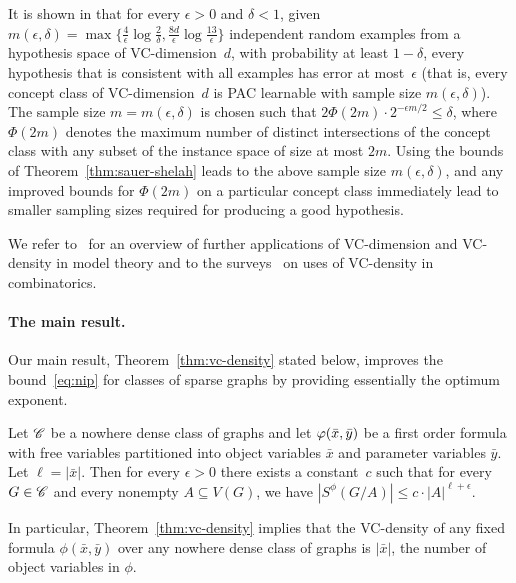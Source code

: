 It is shown in \cite{chervonenkis1971theory,blumer1989learnability} 
that for every $\epsilon>0$ and $\delta<1$, given 
$m(\epsilon,\delta)=\max\{\frac{4}{\epsilon}\log \frac{2}{\delta},
\frac{8d}{\epsilon}\log \frac{13}{\epsilon}\}$ independent
random examples from a hypothesis space of VC-dimension~$d$, 
with probability at least $1-\delta$, every hypothesis that
is consistent with all examples has error at most~$\epsilon$ (that
is, every concept class of VC-dimension~$d$ 
is PAC learnable with sample size $m(\epsilon,\delta)$). 
The sample size $m=m(\epsilon, \delta)$ is chosen such that 
\mbox{$2\Phi(2m)\cdot
2^{-\epsilon m/2}\leq \delta$}, where $\Phi(2m)$ denotes the 
maximum number of distinct intersections of the concept class
with any subset of the instance space of size at most $2m$. 
Using the bounds of Theorem~\ref{thm:sauer-shelah} leads to
the above sample size $m(\epsilon,\delta)$, and any improved 
bounds for $\Phi(2m)$ on a particular concept class
immediately lead to smaller sampling sizes required for
producing a good hypothesis. 

We refer to~\cite{aschenbrenner2016vapnik} for an overview of 
further applications of VC-dimension and VC-density in model
theory and to the surveys~\cite{furedi1991traces,matouvsek1998geometric} 
on uses of VC-density in
combinatorics. 

\paragraph{The main result.}
Our main result, Theorem~\ref{thm:vc-density} stated below, improves the bound~\eqref{eq:nip} for classes of sparse graphs
by providing essentially the optimum exponent.

 \begin{theorem}\label{thm:vc-density}
Let $\mathscr{C}$ be a nowhere dense class of graphs and let $\varphi(\bar{x},\bar{y})$ be a first order formula
with free variables  partitioned  into object variables $\bar x$  and parameter variables $\bar y$. Let $\ell=|\bar x|$. Then 
for every $\epsilon>0$ 
there exists a constant~$c$ such that for every $G\in \mathscr{C}$ and every nonempty
$A\subseteq V(G)$, we have $|S^\phi(G/A)|\leq c\cdot |A|^{\ell+\epsilon}.$
 \end{theorem}

In particular, Theorem~\ref{thm:vc-density} implies that
the VC-density of any fixed formula 
$\phi(\bar x,\bar y)$ over any nowhere dense class of graphs is $|\bar x|$, the number of object variables in $\phi$.

